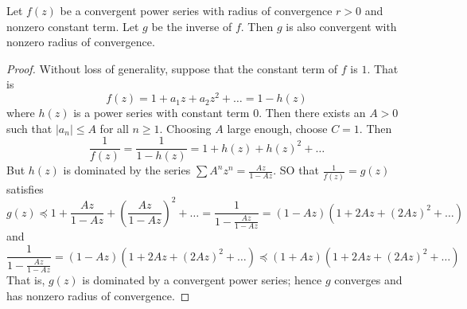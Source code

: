 \begin{theorem}\label{2.3.4}
    Let $f(z)$ be a convergent power series with radius of convergence $r>0$ and
    nonzero constant term. Let  $g$ be the inverse of $f$. Then $g$ is also
    convergent with nonzero radius of convergence.
\end{theorem}
\begin{proof}
    Without loss of generality, suppose that the constant term of $f$ is  $1$.
    That is
    \begin{equation*}
        f(z)=1+a_1z+a_2z^2+\dots=1-h(z)
    \end{equation*}
    where $h(z)$ is a power series with constant term $0$. Then there exists an
     $A>0$ such that  $|a_n| \leq A$ for all  $n \geq 1$. Choosing  $A$ large
     enough, choose  $C=1$. Then
     \begin{equation*}
         \frac{1}{f(z)}=\frac{1}{1-h(z)}=1+h(z)+h(z)^2+\dots
     \end{equation*}
     But $h(z)$ is dominated by the series $\sum{A^nz^n}=\frac{Az}{1-Az}$. SO
     that $\frac{1}{f(z)}=g(z)$ satisfies
     \begin{equation*}
        g(z) \preceq 1+\frac{Az}{1-Az}+(\frac{Az}{1-Az})^2+\dots
        =\frac{1}{1-\frac{Az}{1-Az}}=(1-Az)(1+2Az+(2Az)^2+\dots)
     \end{equation*}
     and
     \begin{equation*}
        \frac{1}{1-\frac{Az}{1-Az}}=(1-Az)(1+2Az+(2Az)^2+\dots) \preceq
        (1+Az)(1+2Az+(2Az)^2+\dots)
     \end{equation*}
     That is, $g(z)$ is dominated by a convergent power series; hence $g$
     converges and has nonzero radius of convergence.
\end{proof}

